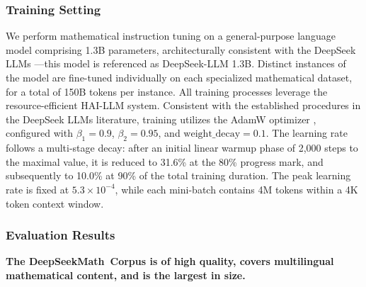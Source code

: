 \begin{itemize}[topsep=0pt]
\subsubsection{Training Setting}
\label{sec:quality-policy}
We perform mathematical instruction tuning on a general-purpose language model comprising 1.3B parameters, architecturally consistent with the DeepSeek LLMs \citep{deepseek-llm}—this model is referenced as DeepSeek-LLM 1.3B. Distinct instances of the model are fine-tuned individually on each specialized mathematical dataset, for a total of 150B tokens per instance. All training processes leverage the resource-efficient HAI-LLM \citep{haillm} system. Consistent with the established procedures in the DeepSeek LLMs literature, training utilizes the AdamW optimizer \citep{adamW}, configured with $\beta_1=0.9$, $\beta_2=0.95$, and $\mathrm{weight\_decay}=0.1$. The learning rate follows a multi-stage decay: after an initial linear warmup phase of 2,000 steps to the maximal value, it is reduced to 31.6\% at the 80\% progress mark, and subsequently to 10.0\% at 90\% of the total training duration. The peak learning rate is fixed at $5.3 \times 10^{-4}$, while each mini-batch contains 4M tokens within a 4K token context window.

\subsubsection{Evaluation Results}

\textbf{The DeepSeekMath~Corpus is of high quality, covers multilingual mathematical content, and is the largest in size.}


\end{itemize}
